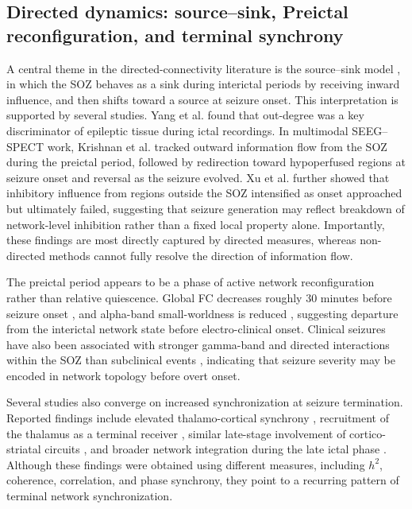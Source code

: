 \documentclass[12pt]{article}
\begin{document}
\subsection{Directed dynamics: source--sink, Preictal reconfiguration, and terminal synchrony}
A central theme in the directed-connectivity literature is the source--sink model \cite{Gunnarsdottir2022-la}, in which the SOZ behaves as a sink during interictal periods by receiving inward influence, and then shifts toward a source at seizure onset. This interpretation is supported by several studies. Yang et al. \cite{Yang2018-yx} found that out-degree was a key discriminator of epileptic tissue during ictal recordings. In multimodal SEEG--SPECT work, Krishnan et al. \cite{Krishnan2024-sq} tracked outward information flow from the SOZ during the preictal period, followed by redirection toward hypoperfused regions at seizure onset and reversal as the seizure evolved. Xu et al. \cite{Xu2025-lh} further showed that inhibitory influence from regions outside the SOZ intensified as onset approached but ultimately failed, suggesting that seizure generation may reflect breakdown of network-level inhibition rather than a fixed local property alone. Importantly, these findings are most directly captured by directed measures, whereas non-directed methods cannot fully resolve the direction of information flow.

The preictal period appears to be a phase of active network reconfiguration rather than relative quiescence. Global FC decreases roughly 30 minutes before seizure onset \cite{Tauste_Campo2018-ga}, and alpha-band small-worldness is reduced \cite{Vecchio2016-dn}, suggesting departure from the interictal network state before electro-clinical onset. Clinical seizures have also been associated with stronger gamma-band and directed interactions within the SOZ than subclinical events \cite{He2025-tw}, indicating that seizure severity may be encoded in network topology before overt onset.

Several studies also converge on increased synchronization at seizure termination. Reported findings include elevated thalamo-cortical synchrony \cite{Evangelista2015-dz}, recruitment of the thalamus as a terminal receiver \cite{Soulier2023-rr}, similar late-stage involvement of cortico-striatal circuits \cite{Aupy2019-je}, and broader network integration during the late ictal phase \cite{Li2025-vh}. Although these findings were obtained using different measures, including $h^2$, coherence, correlation, and phase synchrony, they point to a recurring pattern of terminal network synchronization.
\end{document}
